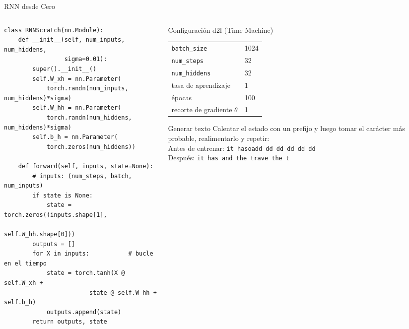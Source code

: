 \documentclass[aspectratio=169, 10pt]{beamer}
\begin{document}
\begin{frame}[fragile]{RNN desde Cero}

	\begin{columns}[T]
		\begin{column}{0.58\textwidth}
			\begin{tcolorbox}[codebox]
\scriptsize
\begin{verbatim}
class RNNScratch(nn.Module):
    def __init__(self, num_inputs, num_hiddens,
                 sigma=0.01):
        super().__init__()
        self.W_xh = nn.Parameter(
            torch.randn(num_inputs, num_hiddens)*sigma)
        self.W_hh = nn.Parameter(
            torch.randn(num_hiddens, num_hiddens)*sigma)
        self.b_h = nn.Parameter(
            torch.zeros(num_hiddens))

    def forward(self, inputs, state=None):
        # inputs: (num_steps, batch, num_inputs)
        if state is None:
            state = torch.zeros((inputs.shape[1],
                                 self.W_hh.shape[0]))
        outputs = []
        for X in inputs:           # bucle en el tiempo
            state = torch.tanh(X @ self.W_xh +
                        state @ self.W_hh + self.b_h)
            outputs.append(state)
        return outputs, state
\end{verbatim}
			\end{tcolorbox}
		\end{column}

		\begin{column}{0.39\textwidth}
			\begin{block}{Configuraci\'on d2l (Time Machine)}
				\small
				\begin{tabular}{@{}ll@{}}
					\texttt{batch\_size} & 1024 \\
					\texttt{num\_steps} & 32 \\
					\texttt{num\_hiddens} & 32 \\
					tasa de aprendizaje & 1 \\
					\'epocas & 100 \\
					recorte de gradiente $\theta$ & 1 \\
				\end{tabular}
			\end{block}

			\begin{block}{Generar texto}
				\small
				Calentar el estado con un prefijo y luego tomar el car\'acter m\'as probable, realimentarlo y repetir:\\[2pt]
				\scriptsize
				Antes de entrenar: \texttt{it hasoadd dd dd dd dd dd}\\
				Despu\'es: \texttt{it has and the trave the t}
			\end{block}
		\end{column}
	\end{columns}

\end{frame}
\end{document}
